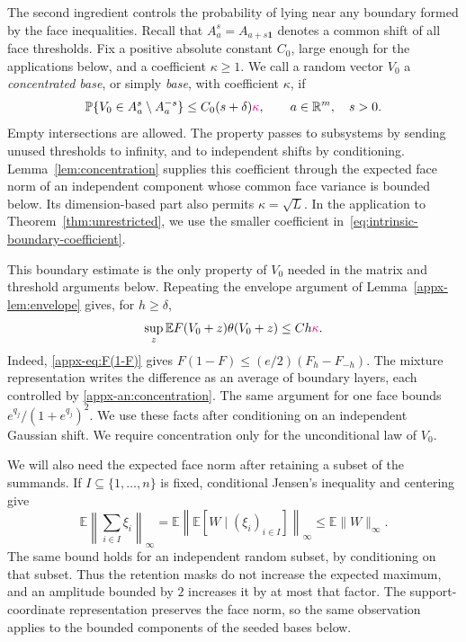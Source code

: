 \documentclass[11pt,letterpaper]{article}
\newcommand{\vSix}[1]{{\color{magenta}#1}}
\newenvironment{vSixBlock}{\color{magenta}}{}
\theoremstyle{remark}
\newcommand{\E}{\mathbb E}
\newcommand{\Pp}{\mathbb P}
\newcommand{\R}{\mathbb R}
\begin{document}
The second ingredient controls the probability of lying near any
boundary formed by the face inequalities. {Recall that
\(A_a^s=A_{a+s\mathbf1}\) denotes a common shift of all face thresholds.}
\vSix{Fix a positive absolute constant \(C_0\), large enough for the
applications below, and a coefficient \(\kappa\ge1\). We call a
random vector \(V_0\) a \emph{concentrated base}, or simply
\emph{base}, with coefficient \(\kappa\), if}
\begin{equation}
 \Pp\{V_0\in A_a^s\setminus A_a^{-s}\}
 \le C_0(s+\delta)\vSix{\kappa},
 \qquad a\in\R^m,\quad s>0.
 \label{appx-an:concentration}
\end{equation}
Empty intersections are allowed. The property passes to subsystems
by sending unused thresholds to infinity, and to independent shifts
by conditioning. \vSix{Lemma~\ref{lem:concentration} supplies this coefficient through
the expected face norm of an independent component whose common face
variance is bounded below. Its dimension-based part also permits
\(\kappa=\sqrt L\). In the application to Theorem~\ref{thm:unrestricted},
we use the smaller coefficient in~\eqref{eq:intrinsic-boundary-coefficient}.}

This boundary estimate is the only property of \(V_0\) needed in the
matrix and threshold arguments below. Repeating the envelope argument of
Lemma~\ref{appx-lem:envelope} gives, for \(h\ge\delta\),
\begin{equation}
 \sup_z\E F(V_0+z)\theta(V_0+z)\le Ch\vSix{\kappa}.
 \label{appx-an:weight-concentration}
\end{equation}
{Indeed, \eqref{appx-eq:F(1-F)} gives}
\(F(1-F)\le(e/2)(F_h-F_{-h})\). The mixture representation writes
the difference as an average of boundary layers, each controlled by
\eqref{appx-an:concentration}. The same argument for one face bounds
\(e^{q_j}/(1+e^{q_j})^2\). We use these facts after conditioning on
an independent Gaussian shift. We require concentration only for the
unconditional law of \(V_0\).

\begin{vSixBlock}
We will also need the expected face norm after retaining a subset of
the summands. If \(I\subseteq\{1,\ldots,n\}\) is fixed, conditional
Jensen's inequality and centering give
\begin{equation}\label{appx-an:retained-maximum}
 \E\left\|\sum_{i\in I}\xi_i\right\|_\infty
 =\E\left\|\E[W\mid(\xi_i)_{i\in I}]\right\|_\infty
 \le\E\|W\|_\infty.
\end{equation}
The same bound holds for an independent random subset, by conditioning
on that subset. Thus the retention masks do not increase the expected
maximum, and an amplitude bounded by \(2\) increases it by at most
that factor. The support-coordinate representation preserves the
face norm, so the same observation applies to the bounded components
of the seeded bases below.
\end{vSixBlock}
\end{document}
